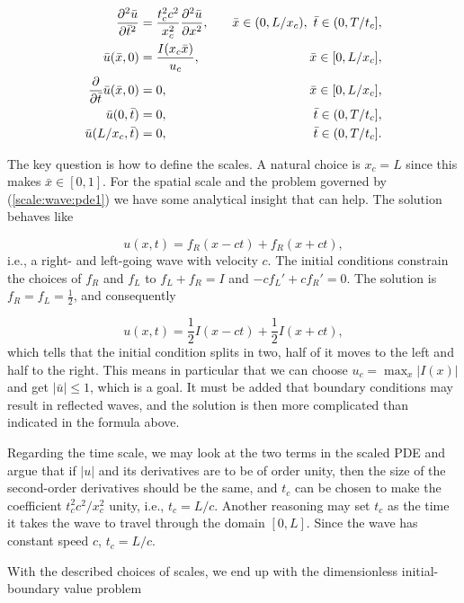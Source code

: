 \documentclass[graybox,envcountchap,sectrefs,final]{svmonodo}
\begin{document}
\begin{align*}
\frac{\partial^2 \bar u}{\partial \bar t^2} &=
\frac{t_c^2c^2}{x_c^2}{\partial^2 \bar u\over\partial x^2}, \quad & \bar x\in (0,L/x_c),\ \bar t\in (0,T/t_c],
\\ 
\bar u(\bar x,0) &= \frac{I(x_c\bar x)}{u_c},
\quad &\bar x\in [0,L/x_c],
\\ 
\frac{\partial}{\partial \bar t}\bar u(\bar x,0) &= 0,
\quad & \bar x\in [0,L/x_c],
\\ 
\bar u(0,\bar t) & = 0,
\quad  & \bar t\in (0,T/t_c],
\\ 
\bar u(L/x_c,\bar t) & = 0,
\quad &\bar t\in (0,T/t_c].
\end{align*}

The key question is how to define the scales.
A natural choice is $x_c=L$ since this makes $\bar x\in [0,1]$.
For the spatial scale and the problem governed by
(\ref{scale:wave:pde1}) we
have some analytical insight that can help.
The solution behaves like

\begin{equation}
u(x,t) = f_R(x-ct) + f_R(x+ct),
\label{scale:wave:pde:sol:general}
\end{equation}
i.e., a right- and left-going wave with velocity $c$. The initial
conditions constrain the choices of $f_R$ and $f_L$ to $f_L + f_R=I$
and $-cf_L' + cf_R' = 0$. The solution is $f_R = f_L = \frac{1}{2}$,
and consequently

\[
u(x,t) = \frac{1}{2}I(x-ct) + \frac{1}{2}I(x+ct),
\]
which tells that the initial condition splits in two, half of it moves
to the left and half to the right.
This means in particular that we can choose $u_c=\max_x |I(x)|$
and get $|\bar u|\leq 1$, which is a goal. It must be added that
boundary conditions may result in reflected waves, and the solution is
then more complicated than indicated in the formula above.

Regarding the time scale, we may look at the two terms in the scaled
PDE and argue that if $|u|$ and its derivatives are to be of order unity,
then the size of the second-order derivatives should be the same, and
$t_c$ can be chosen to make the coefficient $t_c^2 c^2 /x_c^2$ unity,
i.e., $t_c=L/c$.
Another reasoning may set $t_c$ as the time it takes the wave
to travel through the domain $[0,L]$. Since the wave has constant
speed $c$, $t_c = L/c$.

With the described choices of scales,
we end up with the dimensionless initial-boundary value problem
\end{document}
